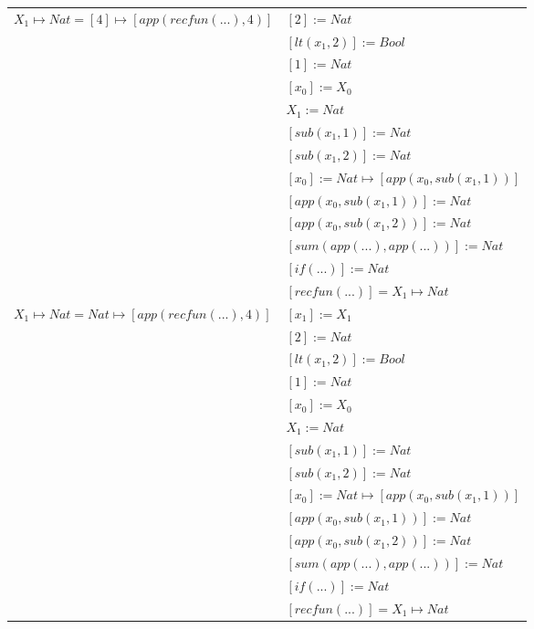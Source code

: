 \begin{exercise}
\begin{description}
\begin{center}
\begin{longtable}{ | l | l | }
                        $ X_1 \mapsto Nat = [4] \mapsto [app(recfun(...), 4)]$ & $[2] := Nat$ \\
                        & $[lt(x_1 , 2)] := Bool$ \\
                        & $[1] := Nat$ \\
                        & $[x_0] := X_0$ \\
                        & $X_1 := Nat$ \\
                        & $[sub(x_1,1)] := Nat$ \\
                        & $[sub(x_1,2)] := Nat$ \\
                        & $[x_0] := Nat \mapsto [app(x_0, sub(x_1,1))]$ \\
                        & $[app(x_0, sub(x_1,1))] := Nat$ \\
                        & $[app(x_0, sub(x_1,2))] := Nat$ \\
                        & $[sum(app(...), app(...))] := Nat$ \\
                        & $[if(...)] := Nat $ \\
                        & $[recfun(...)] = X_1 \mapsto Nat$ \\
                    \hline
                        $ X_1 \mapsto Nat = Nat \mapsto [app(recfun(...), 4)]$ & $[x_1] := X_1$ \\
                        & $[2] := Nat$ \\
                        & $[lt(x_1 , 2)] := Bool$ \\
                        & $[1] := Nat$ \\
                        & $[x_0] := X_0$ \\
                        & $X_1 := Nat$ \\
                        & $[sub(x_1,1)] := Nat$ \\
                        & $[sub(x_1,2)] := Nat$ \\
                        & $[x_0] := Nat \mapsto [app(x_0, sub(x_1,1))]$ \\
                        & $[app(x_0, sub(x_1,1))] := Nat$ \\
                        & $[app(x_0, sub(x_1,2))] := Nat$ \\
                        & $[sum(app(...), app(...))] := Nat$ \\
                        & $[if(...)] := Nat $ \\
                        & $[recfun(...)] = X_1 \mapsto Nat$ \\

\end{longtable}
\end{center}
\end{description}
\end{exercise}
